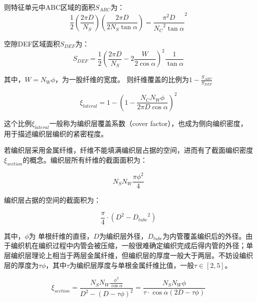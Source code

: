 则特征单元中ABC区域的面积$ S_{ABC} $为：
\begin{equation}
\frac{1}{2}\left( {\frac{{2\pi D}}{{{N_S}}}} \right)\left( {\frac{{2\pi D}}{{2{N_S}\tan \alpha }}} \right) = {\frac{{{\pi ^2}D}}{{{N_C}^2\tan \alpha }}^2}
\end{equation}


空隙DEF区域面积$ S_{DEF} $为：
\begin{equation}
\label{eq:area-of-gaps}
S_{DEF}=\frac{1}{2}{\left( {\frac{{2\pi D}}{{{N_S}}} - 2\frac{W}{{2\cos \alpha }}} \right)^2}\frac{1}{{\tan \alpha }}
\end{equation}


其中，$ W = {N_W}\phi  $，为一股纤维的宽度。
则纤维覆盖的比例为$ 1 - \frac{{{S_{ABC}}}}{{{S_{DEF}}}} $


\begin{equation}
\xi_{lateral} = 1 - {\left( {1 - \frac{{{N_C}{N_W}\phi }}{{2\pi D\cos \alpha }}} \right)^2}
\end{equation}

这个比例$ \xi_{lateral}  $一般称为编织层覆盖系数（cover factor），也成为侧向编织密度，用于描述编织层编织的紧密程度。



若编织层采用金属纤维，纤维不能填满编织层占据的空间，进而有了截面编织密度$ \xi_{section} $的概念。编织层所有纤维的截面面积为：

\begin{equation}
{N_S}{N_W}\frac{{\pi {\phi ^2}}}{4}
\end{equation}

编织层占据的空间的截面积为：

\begin{equation}
\frac{\pi }{4}\cdot({D^2} - {D_{tube}}^2)
\end{equation}

其中，$ \phi $为 单根纤维的直径，$ D $为编织层外径，$ D_{tube} $为内管覆盖编织后的外径。由于编织机在编织过程中内管会被压缩，一般很难确定编织完成后得内管的外径；单层编织层理论上相当于两层金属纤维，但编织层的厚度一般大于两层。不妨设编织层的厚度为$ \tau\phi $，其中$ \tau $为编织层厚度与单根金属纤维比值，一般$ \tau  \in \left[ {2,5} \right]$。


\begin{equation}
\label{eq:section-epsilon}
{\xi _{section}} = \frac{{{N_S}{N_W}\frac{{{\phi ^2}}}{{\cos \alpha }}}}{{{D^2} - {{\left( {D - \tau \phi } \right)}^2}}} = \frac{{{N_S}{N_W}\phi }}{{\tau  \cdot \cos \alpha (2D - \tau \phi )}}
\end{equation}

